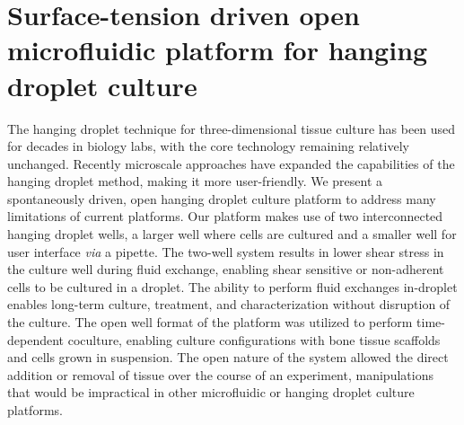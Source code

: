 \chapter{Surface-tension driven open microfluidic platform for hanging droplet culture}\label{Chap:HangingDroplet}

The hanging droplet technique for three-dimensional tissue culture has been used for decades in biology labs, with the core technology remaining relatively unchanged. Recently microscale approaches have expanded the capabilities of the hanging droplet method, making it more user-friendly. We present a spontaneously driven, open hanging droplet culture platform to address many limitations of current platforms. Our platform makes use of two interconnected hanging droplet wells, a larger well where cells are cultured and a smaller well for user interface \textit{via} a pipette. The two-well system results in lower shear stress in the culture well during fluid exchange, enabling shear sensitive or non-adherent cells to be cultured in a droplet. The ability to perform fluid exchanges in-droplet enables long-term culture, treatment, and characterization without disruption of the culture. The open well format of the platform was utilized to perform time-dependent coculture, enabling culture configurations with bone tissue scaffolds and cells grown in suspension. The open nature of the system allowed the direct addition or removal of tissue over the course of an experiment, manipulations that would be impractical in other microfluidic or hanging droplet culture platforms. 


